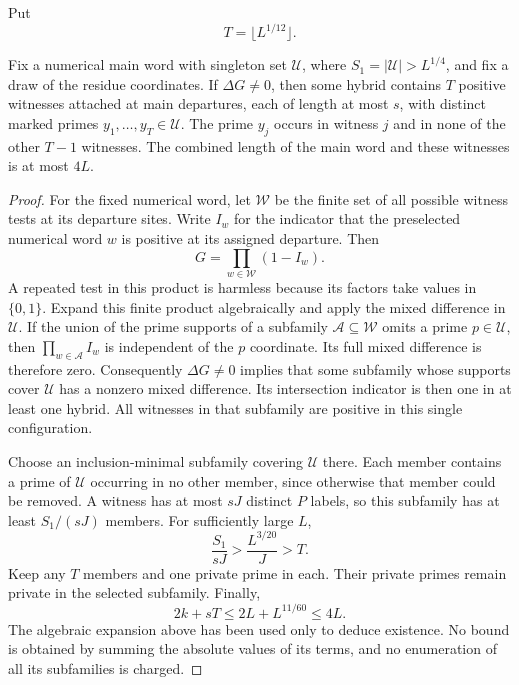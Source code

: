 Put
\[
 T=\lfloor L^{1/12}\rfloor.
\]
\begin{lemma}\label{q:witness-cover}
Fix a numerical main word with singleton set $\mathcal U$, where
$S_1=|\mathcal U|>L^{1/4}$, and fix a draw of the residue coordinates.
If $\Delta G\ne0$, then some hybrid contains $T$ positive witnesses
attached at main departures, each of length at most $s$, with distinct
marked primes $y_1,\ldots,y_T\in\mathcal U$.  The prime $y_j$ occurs
in witness $j$ and in none of the other $T-1$ witnesses.  The combined
length of the main word and these witnesses is at most $4L$.
\end{lemma}

\begin{proof}
For the fixed numerical word, let $\mathscr W$ be the finite set of all
possible witness tests at its departure sites.  Write $I_w$ for the
indicator that the preselected numerical word $w$ is positive at its
assigned departure.  Then
\[
 G=\prod_{w\in\mathscr W}(1-I_w).
\]
A repeated test in this product is harmless because its factors take
values in $\{0,1\}$.  Expand this finite product algebraically and apply
the mixed difference in $\mathcal U$.  If the union of the prime supports
of a subfamily $\mathscr A\subseteq\mathscr W$ omits a prime
$p\in\mathcal U$, then $\prod_{w\in\mathscr A}I_w$ is independent of
the $p$ coordinate.  Its full mixed difference is therefore zero.
Consequently $\Delta G\ne0$ implies that some subfamily whose supports
cover $\mathcal U$ has a nonzero mixed difference.  Its intersection
indicator is then one in at least one hybrid.  All witnesses in that
subfamily are positive in this single configuration.

Choose an inclusion-minimal subfamily covering $\mathcal U$ there.
Each member contains a prime of $\mathcal U$ occurring in no other
member, since otherwise that member could be removed.  A witness has at
most $sJ$ distinct $P$ labels, so this subfamily has at least
$S_1/(sJ)$ members.  For sufficiently large $L$,
\[
 \frac{S_1}{sJ}>\frac{L^{3/20}}{J}>T.
\]
Keep any $T$ members and one private prime in each.  Their private
primes remain private in the selected subfamily.  Finally,
\[
 2k+sT\le 2L+L^{11/60}\le4L.
\]
The algebraic expansion above has been used only to deduce existence.
No bound is obtained by summing the absolute values of its terms, and
no enumeration of all its subfamilies is charged.
\end{proof}

